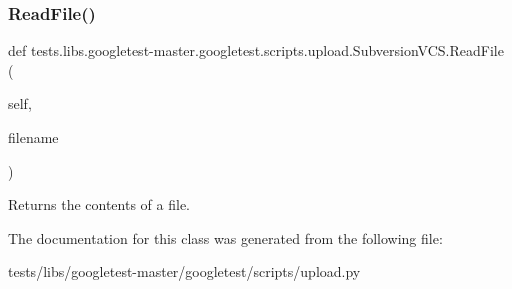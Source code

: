 \subsubsection{\texorpdfstring{Read\+File()}{ReadFile()}}
{\footnotesize\ttfamily def tests.\+libs.\+googletest-\/master.\+googletest.\+scripts.\+upload.\+Subversion\+V\+C\+S.\+Read\+File (\begin{DoxyParamCaption}\item[{}]{self,  }\item[{}]{filename }\end{DoxyParamCaption})}

\begin{DoxyVerb}Returns the contents of a file.\end{DoxyVerb}
 

The documentation for this class was generated from the following file\+:\begin{DoxyCompactItemize}
\item 
tests/libs/googletest-\/master/googletest/scripts/upload.\+py\end{DoxyCompactItemize}
